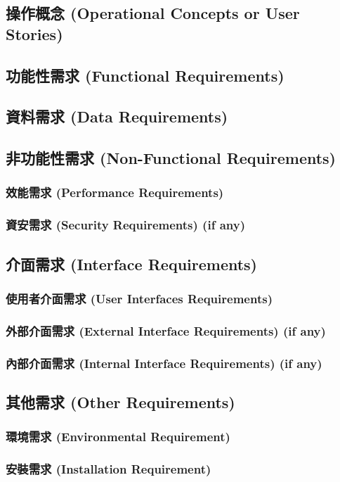 \documentclass[a4paper, 12pt]{article}
\begin{document}
\subsection{操作概念 (Operational Concepts or User Stories)}
\subsection{功能性需求 (Functional Requirements)}
\subsection{資料需求 (Data Requirements)}
\subsection{非功能性需求 (Non-Functional Requirements)}
\subsubsection{效能需求 (Performance Requirements)}
\subsubsection{資安需求 (Security Requirements) (if any)}
\subsection{介面需求 (Interface Requirements)}
\subsubsection{使用者介面需求 (User Interfaces Requirements)}
\subsubsection{外部介面需求 (External Interface Requirements) (if any)}
\subsubsection{內部介面需求 (Internal Interface Requirements) (if any)}
\subsection{其他需求 (Other Requirements)}
\subsubsection{環境需求 (Environmental Requirement)}
\subsubsection{安裝需求 (Installation Requirement)}
\end{document}
